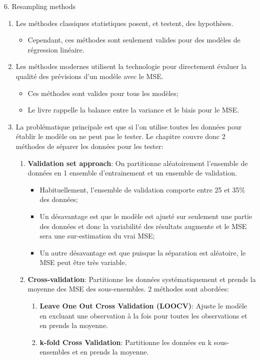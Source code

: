 \documentclass[12pt, titlepage, french]{report}
\begin{document}
\begin{CHPT_SUMM}{6. Resampling methods}
\begin{enumerate}
	\item	Les méthodes classiques statistiques posent, et testent, des hypothèses.
	\begin{itemize}
		\item	Cependant, ces méthodes sont seulement valides pour des modèles de régression linéaire.
	\end{itemize}
	\item	Les méthodes modernes utilisent la technologie pour directement évaluer la qualité des prévisions d'un modèle avec le MSE.
	\begin{itemize}
		\item	Ces méthodes sont valides pour tous les modèles;
		\item	Le livre rappelle la balance entre la variance et le biais pour le MSE.
	\end{itemize}
	\item	La problématique principale est que si l'on utilise toutes les données pour établir le modèle on ne peut pas le tester. Le chapitre couvre donc 2 méthodes de séparer les données pour les tester:
	\begin{enumerate}
		\item	\textbf{Validation set approach}: On partitionne aléatoirement l'ensemble de données en 1 ensemble d'entrainement et un ensemble de validation.
		\begin{itemize}
			\item	Habituellement, l'ensemble de validation comporte entre 25 et 35\% des données;
			\item	Un désavantage est que le modèle est ajusté sur seulement une partie des données et donc la variabilité des résultats augmente et le MSE sera une sur-estimation du vrai MSE;
			\item	Un autre désavantage est que puisque la séparation est aléatoire, le MSE peut être très variable.
		\end{itemize}
		\item	\textbf{Cross-validation}: Partitionne les données systématiquement et prends la moyenne des MSE des sous-ensembles. 2 méthodes sont abordées:
		\begin{enumerate}
			\item	\textbf{Leave One Out Cross Validation (LOOCV)}: Ajuste le modèle en excluant une observation à la fois pour toutes les observations et en prends la moyenne.
			\item	\textbf{k-fold Cross Validation}: Partitionne les données en k sous-ensembles et en prends la moyenne.

\end{enumerate}
\end{enumerate}
\end{enumerate}
\end{CHPT_SUMM}
\end{document}
